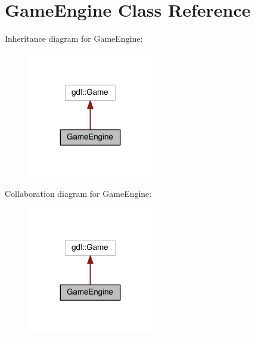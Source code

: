 \hypertarget{class_game_engine}{}\section{Game\+Engine Class Reference}
\label{class_game_engine}


Inheritance diagram for Game\+Engine\+:\nopagebreak
\begin{figure}[H]
\begin{center}
\leavevmode
\includegraphics[width=155pt]{class_game_engine__inherit__graph}
\end{center}
\end{figure}


Collaboration diagram for Game\+Engine\+:\nopagebreak
\begin{figure}[H]
\begin{center}
\leavevmode
\includegraphics[width=155pt]{class_game_engine__coll__graph}
\end{center}
\end{figure}
